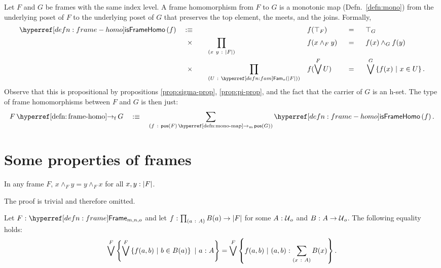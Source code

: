 \begin{defn}\label{defn:frame-homo}
  Let $F$ and $G$ be frames with the same index level. A frame homomorphism from $F$ to
  $G$ is a monotonic map (Defn.~\ref{defn:mono}) from the underlying poset of $F$ to the
  underlying poset of $G$ that preserves the top element, the meets, and the joins.
  Formally,
  \begin{alignat*}{5}
    \isframehomo{f} \quad&\is\quad && &&f(\top_F) &&\idnm{} &&\top_G \\
      &\hspace{0.55em}\times\quad  &&\pity{x~y}{\abs{F}}{&&f(x \wedge_F y) &&\idnm{} &&f(x) \wedge_G f(y)} \\
      &\hspace{0.55em}\times\quad  &&\pity{U}{\sub{o}{\abs{F}}}{&&f(\bigvee^F U) &&\idnm{} &&\bigvee^G \setof{ f(x) ~|~ x \in U }}.
  \end{alignat*}
  Observe that this is propositional by propositions \ref{prop:sigma-prop},
  \ref{prop:pi-prop}, and the fact that the carrier of $G$ is an h-set. The type of frame
  homomorphisms between $F$ and $G$ is then just:
  \begin{equation*}
    \framehomo{F}{G} \quad\is\quad \sigmaty{f}{\mono{\posof{F}}{\posof{G}}}{\isframehomo{f}}.
  \end{equation*}
\end{defn}

\section{Some properties of frames}

\begin{prop}\label{prop:comm}
  In any frame $F$, $x \wedge_F y = y \wedge_F x$ for all $x, y:\left| F \right|$.
\end{prop}
The proof is trivial and therefore omitted.

\begin{lemma}\label{lem:flatten}
  Let $\oftyI{F}{\framety{m}{n}{o}}$ and let $f\hspace{0.1mm}:\hspace{0.1mm}\prod_{(a~:~A)} B(a) \rightarrow \left| F \right|$ for
  some $A\hspace{0.1mm}:\hspace{0.1mm}\mathcal{U}{}_o$ and $B\hspace{0.1mm}:\hspace{0.1mm}A \rightarrow \mathcal{U}{}_o$. The following equality
  holds:
  \begin{equation*}
      \bigvee^F \left\{  \bigvee^F \left\{  f(a, b) ~|~ b \in B(a)  \right\} ~|~ a\hspace{0.1mm}:\hspace{0.1mm}A           \right\}
    = \bigvee^F \left\{  f(a, b)             ~|~ (a, b)\hspace{0.1mm}:\hspace{0.1mm}\sum_{(x~:~A)} B(x)  \right\}.
  \end{equation*}
\end{lemma}

